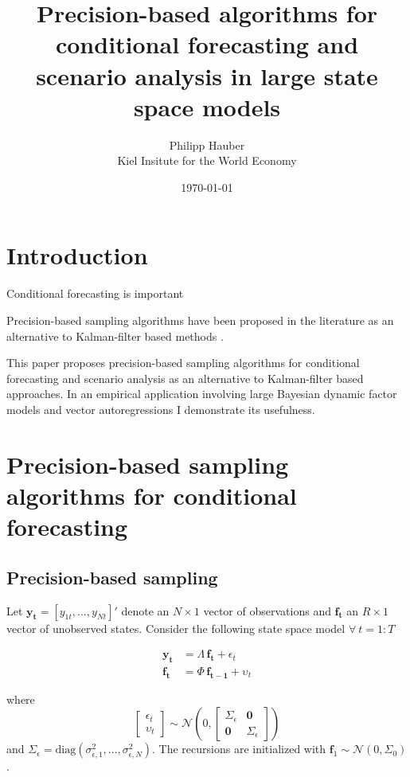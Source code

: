 \documentclass[notitlepage,a4paper,12pt]{article}
\begin{document}
\title{Precision-based algorithms for conditional forecasting and scenario analysis in large state space models}

\author{
  Philipp Hauber\\
  Kiel Insitute for the World Economy
}
\date{\today}

\maketitle

\section{Introduction}

Conditional forecasting is important \citep{bgl_2015ijf}

Precision-based sampling algorithms have been proposed in the literature as an alternative to Kalman-filter based methods \citep{chanjeliazkov_2009}.

This paper proposes precision-based sampling algorithms for conditional forecasting and scenario analysis as an alternative to Kalman-filter based approaches. In an empirical application involving large Bayesian dynamic factor models and vector autoregressions I demonstrate its usefulness. 

\section{Precision-based sampling algorithms for conditional forecasting}

\subsection{Precision-based sampling}

Let $\mathbf{y_t} = [y_{1t}, \dots, y_{Nt}]'$ denote an $N \times 1$ vector of observations and $\mathbf{f_t}$ an $R \times 1$ vector of unobserved states. Consider the following state space model $\forall \: t = 1:T$

\begin{align}
    \mathbf{y_t} &= \Lambda \, \mathbf{f_t} + \epsilon_t \\
    \mathbf{f_t} &= \Phi \, \mathbf{f_{t-1}} + \upsilon_t
\end{align}

where 
$$
\begin{bmatrix}
    \epsilon_t \\
    \upsilon_t
\end{bmatrix}
\sim \mathcal{N}(0,
\begin{bmatrix}
\Sigma_{\epsilon} & \mathbf{0} \\
\mathbf{0} & \Sigma_{\epsilon}
\end{bmatrix}
)
$$
and $\Sigma_{\epsilon} = \text{diag}(\sigma^2_{\epsilon, 1}, \dots, \sigma^2_{\epsilon, N})$. The recursions are initialized with $\mathbf{f}_1 \sim \mathcal{N}(0, \Sigma_0)$.
\end{document}
